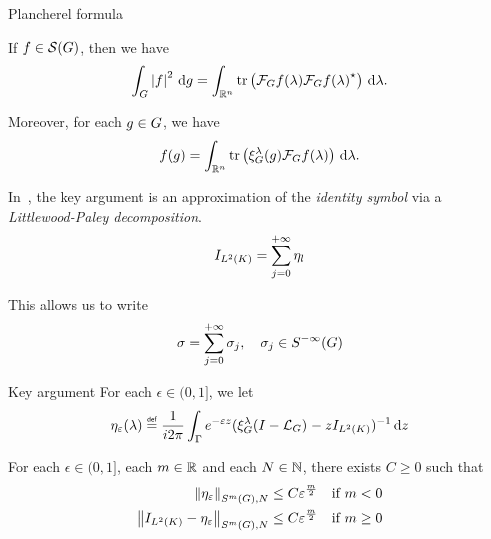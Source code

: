 \documentclass[handout]{beamer}
\begin{document}
\begin{frame}{Plancherel formula}
    \begin{theorem}
        If $f \in \Schwartz \Group$,
        then we have
        \begin{align*}
            \int_\Group \abs f^2 \dd g
            = \int_{\R^n} \tr \left(\Fourier f(\lambda) \adj {\Fourier f(\lambda)}\right) \dd \lambda.
        \end{align*}

        Moreover,
        for each $g \in \Group$, we have
        \begin{align*}
            f(g)
            = \int_{\R^n} \tr \left(\Rep \lambda(g) \Fourier f(\lambda)\right) \dd \lambda.
        \end{align*}
    \end{theorem}
\end{frame}

\begin{frame}
    In~\cite{Fischer2015,FischerRuzhansky16},
    the key argument is an approximation of the \emph{identity symbol} via a \emph{Littlewood-Paley decomposition}.
    \begin{align*}
        \Id {\Lebesgue 2 \CompactGroup} = \sum_{j = 0}^{+ \infty} \eta_l
    \end{align*}

    This allows us to write
    \begin{align*}
        \sigma = \sum_{j = 0}^{+ \infty} \sigma_j,
        \quad
        \sigma_j \in \SmoothingSymbols
    \end{align*}
\end{frame}

\begin{frame}{Key argument}
    For each $\epsilon \in (0, 1]$,
    we let
    \begin{align*}
        \eta_\epsilon(\lambda)
        \defeq
        \frac 1 {\i \turn}
        \int_\Gamma
        \e^{-\epsilon z}
        (\Rep \lambda \BesselPotentialSquared {} - z \Id {\Lebesgue 2 \CompactGroup})^{-1}
        \dd z
    \end{align*}

    \pause

    \begin{theorem}
        For each $\epsilon \in (0, 1]$, each $m \in \R$ and each $N \in \N$,
        there exists $C \geq 0$ such that
        \begin{align*}
                \SymbolSemiNorm m {} N {\eta_\epsilon}
                &\leq C \epsilon^\frac m 2
                & \text{if } m < 0\\
                \SymbolSemiNorm m {} N {\Id {\Lebesgue 2 \CompactGroup} - \eta_\epsilon}
                &\leq C \epsilon^\frac m 2
                & \text{if } m \geq 0
        \end{align*}
    \end{theorem}
\end{frame}
\end{document}
